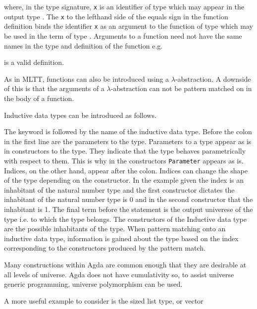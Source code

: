 
where, in the type signature, \verb|x| is an identifier of type 
which may appear in the output type . The \verb|x| to the
lefthand side of the equals sign in the function definition binds the identifier
\verb|x| as an argument to the function of type  which may be
used in the term  of type . Arguments to a
function need not have the same names in the type and definition of the function
e.g.

is a valid definition.

As in MLTT, functions can also be introduced using a $\lambda$-abstraction. A
downside of this is that the arguments of a $\lambda$-abstraction can not be
pattern matched on in the body of a function.


Inductive data types can be introduced as follows.


The  keyword is followed by the name of the inductive data
type. Before the colon in the first line are the parameters to the type.
Parameters to a type appear as is in constructors to the type. They indicate
that the type behaves parametrically with respect to them. This is why in the
constructors \verb|Parameter| appears as is. Indices, on the other hand, appear
after the colon. Indices can change the shape of the type depending on the
constructor. In the example given the index is an inhabitant of the natural
number type and the first constructor dictates the inhabitant of the natural
number type is 0 and in the second constructor that the inhabitant is 1. The
final term before the  statement is the output univerese of
the type i.e. to which  the type belongs. The constructors of
the Inductive data type are the possible inhabitants of the type. When pattern
matching onto an inductive data type, information is gained about the type based
on the index corresponding to the constructors produced by the pattern match.

Many constructions within Agda are common enough that they are desirable at all
levels of universe. Agda does not have cumulativity so, to assist universe
generic programming, universe polymorphism can be used.

A more useful example to consider is the sized list type, or vector

